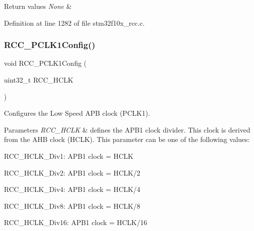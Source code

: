 \begin{DoxyRetVals}{Return values}
{\em None} & \\
\hline
\end{DoxyRetVals}


Definition at line 1282 of file stm32f10x\+\_\+rcc.\+c.

\mbox{\label{group___r_c_c___exported___functions_ga448137346d4292985d4e7a61dd1a824f}} 
\subsubsection{\texorpdfstring{R\+C\+C\+\_\+\+P\+C\+L\+K1\+Config()}{RCC\_PCLK1Config()}}
{\footnotesize\ttfamily void R\+C\+C\+\_\+\+P\+C\+L\+K1\+Config (\begin{DoxyParamCaption}\item[{uint32\+\_\+t}]{R\+C\+C\+\_\+\+H\+C\+LK }\end{DoxyParamCaption})}



Configures the Low Speed A\+PB clock (P\+C\+L\+K1). 


\begin{DoxyParams}{Parameters}
{\em R\+C\+C\+\_\+\+H\+C\+LK} & defines the A\+P\+B1 clock divider. This clock is derived from the A\+HB clock (H\+C\+LK). This parameter can be one of the following values\+: \begin{DoxyItemize}
\item R\+C\+C\+\_\+\+H\+C\+L\+K\+\_\+\+Div1\+: A\+P\+B1 clock = H\+C\+LK \item R\+C\+C\+\_\+\+H\+C\+L\+K\+\_\+\+Div2\+: A\+P\+B1 clock = H\+C\+L\+K/2 \item R\+C\+C\+\_\+\+H\+C\+L\+K\+\_\+\+Div4\+: A\+P\+B1 clock = H\+C\+L\+K/4 \item R\+C\+C\+\_\+\+H\+C\+L\+K\+\_\+\+Div8\+: A\+P\+B1 clock = H\+C\+L\+K/8 \item R\+C\+C\+\_\+\+H\+C\+L\+K\+\_\+\+Div16\+: A\+P\+B1 clock = H\+C\+L\+K/16 \end{DoxyItemize}
\\
\hline
\end{DoxyParams}

